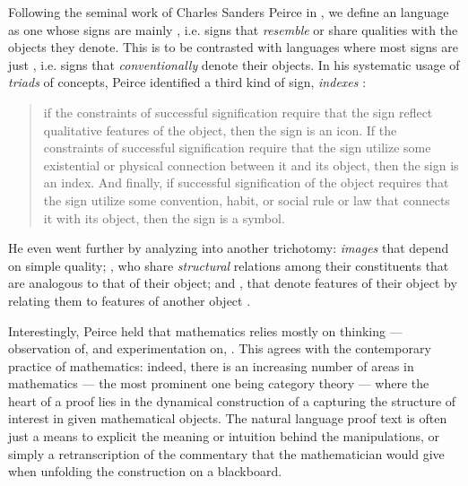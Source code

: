 \AP
Following the seminal work of Charles Sanders Peirce in
, we define an 
language as one whose signs are mainly , i.e. signs that
\emph{resemble} or share qualities with the objects they denote. This is to be
contrasted with  languages where most signs are just
, i.e. signs that \emph{conventionally} denote their objects.
In his systematic usage of \emph{triads} of concepts, Peirce identified a third
kind of sign, \emph{indexes} :
\begin{quote}
  if the constraints of successful signification require that the sign reflect
  qualitative features of the object, then the sign is an icon. If the
  constraints of successful signification require that the sign utilize some
  existential or physical connection between it and its object, then the sign is
  an index. And finally, if successful signification of the object requires that
  the sign utilize some convention, habit, or social rule or law that connects
  it with its object, then the sign is a symbol.
\end{quote}
\AP He even went further by analyzing  into another
trichotomy:
\emph{images} that depend on simple quality; , who share
\emph{structural} relations among their constituents that are analogous to that
of their object; and , that denote features of their object by
relating them to features of another object .

Interestingly, Peirce held that mathematics relies mostly on \emph{}
thinking --- observation of, and experimentation on, 
. This agrees with the contemporary
practice of mathematics: indeed, there is an increasing number of areas in
mathematics --- the most prominent one being category theory --- where the heart
of a proof lies in the dynamical construction of a \emph{} capturing the
structure of interest in given mathematical objects. The natural language proof
text is often just a means to explicit the meaning or intuition behind the
 manipulations, or simply a retranscription of the commentary that
the mathematician would give when unfolding the construction on a blackboard.

